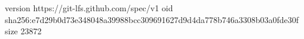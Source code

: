 version https://git-lfs.github.com/spec/v1
oid sha256:e7d29b0d73e348048a39988bcc309691627d9d4da778b746a3308b03a0fde30f
size 23872

